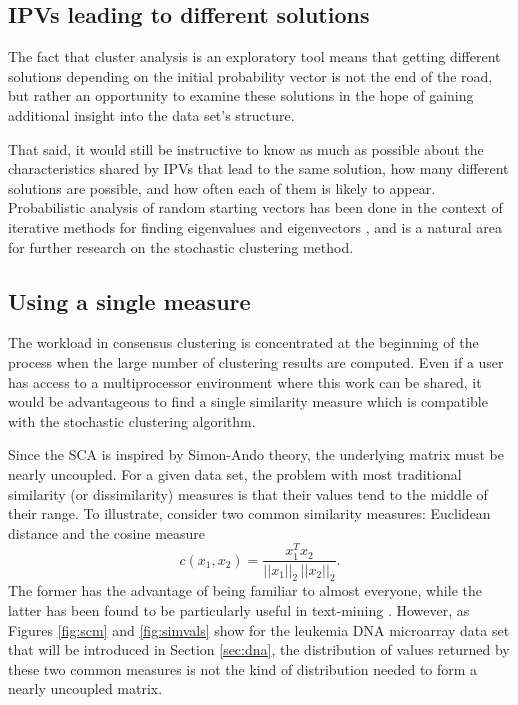 \documentclass[final]{siamltex}
\begin{document}
\subsection{IPVs leading to different solutions}

The fact that cluster analysis is an exploratory tool means that getting different solutions depending on the initial probability vector is not the end of the road, but rather an opportunity to examine these solutions in the hope of gaining additional insight into the data set's structure.

That said, it would still be instructive to know as much as possible about the characteristics shared by IPVs that lead to the same solution, how many different solutions are possible, and how often each of them is likely to appear. Probabilistic analysis of random starting vectors has been done in the context of iterative methods for finding eigenvalues and eigenvectors \cite{dixon1983eee, jessup1992iai}, and is a natural area for further research on the stochastic clustering method.

\subsection{Using a single measure} \label{sec:singlemeasure}
The workload in consensus clustering is concentrated at the beginning of the process when the large number of clustering results are computed. Even if a user has access to a multiprocessor environment where this work can be shared, it would be advantageous to find a single similarity measure which is compatible with the stochastic clustering algorithm.

Since the SCA is inspired by Simon-Ando theory, the underlying matrix must be nearly uncoupled. For a given data set, the problem with most traditional similarity (or dissimilarity) measures is that their values tend to the middle of their range. To illustrate, consider two common similarity measures: Euclidean distance and the cosine measure
$$
c({x}_{1},{x}_{2}) = \frac{{x}_{1}^{T} {x}_{2}} {||{x}_{1}||_{2} \, ||{x}_{2}||_{2}}.
$$
The former has the advantage of being familiar to almost everyone, while the latter has been found to be particularly useful in text-mining \cite{berry}. However, as Figures \ref{fig:scm} and \ref{fig:simvals} show for the leukemia DNA microarray data set that will be introduced in Section \ref{sec:dna}, the distribution of values returned by these two common measures is not the kind of distribution needed to form a nearly uncoupled matrix. 
\end{document}
